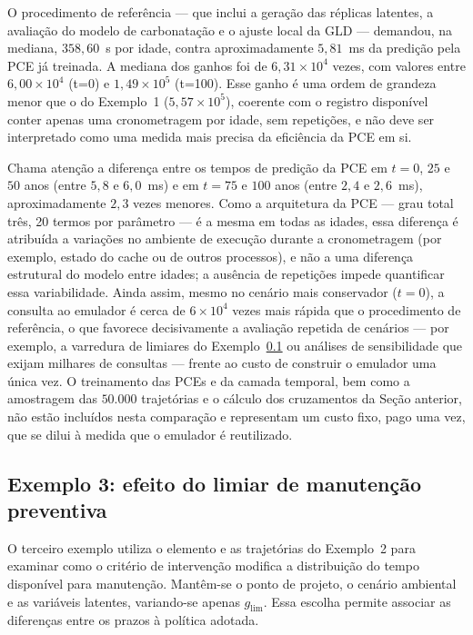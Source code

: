 O procedimento de referência --- que inclui a geração das réplicas latentes, a avaliação do modelo de carbonatação e o ajuste local da GLD --- demandou, na mediana, $358{,}60$~s por idade, contra aproximadamente $5{,}81$~ms da predição pela PCE já treinada. A mediana dos ganhos foi de $6{,}31\times10^4$ vezes, com valores entre $6{,}00\times10^4$ (t=0) e $1{,}49\times10^5$ (t=100). Esse ganho é uma ordem de grandeza menor que o do Exemplo~1 ($5{,}57\times10^5$), coerente com o registro disponível conter apenas uma cronometragem por idade, sem repetições, e não deve ser interpretado como uma medida mais precisa da eficiência da PCE em si.

Chama atenção a diferença entre os tempos de predição da PCE em $t=0$, $25$ e $50$ anos (entre $5{,}8$ e $6{,}0$~ms) e em $t=75$ e $100$ anos (entre $2{,}4$ e $2{,}6$~ms), aproximadamente $2{,}3$ vezes menores. Como a arquitetura da PCE --- grau total três, 20 termos por parâmetro --- é a mesma em todas as idades, essa diferença é atribuída a variações no ambiente de execução durante a cronometragem (por exemplo, estado do cache ou de outros processos), e não a uma diferença estrutural do modelo entre idades; a ausência de repetições impede quantificar essa variabilidade. Ainda assim, mesmo no cenário mais conservador ($t=0$), a consulta ao emulador é cerca de $6\times10^4$ vezes mais rápida que o procedimento de referência, o que favorece decisivamente a avaliação repetida de cenários --- por exemplo, a varredura de limiares do Exemplo~\ref{subsec:exemplo3} ou análises de sensibilidade que exijam milhares de consultas --- frente ao custo de construir o emulador uma única vez. O treinamento das PCEs e da camada temporal, bem como a amostragem das $50.000$ trajetórias e o cálculo dos cruzamentos da Seção anterior, não estão incluídos nesta comparação e representam um custo fixo, pago uma vez, que se dilui à medida que o emulador é reutilizado.

\subsection{Exemplo 3: efeito do limiar de manutenção preventiva}
\label{subsec:exemplo3}

O terceiro exemplo utiliza o elemento e as trajetórias do Exemplo~2 para examinar como o critério de intervenção modifica a distribuição do tempo disponível para manutenção. Mantêm-se o ponto de projeto, o cenário ambiental e as variáveis latentes, variando-se apenas $g_{\mathrm{lim}}$. Essa escolha permite associar as diferenças entre os prazos à política adotada.

